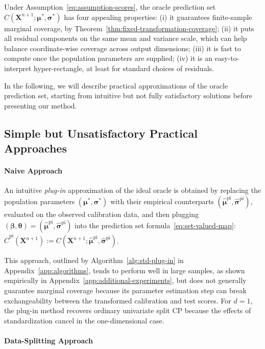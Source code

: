 Under Assumption~\ref{eq:assumption-scores}, the oracle prediction set $C(\mathbf X^{n+1};\boldsymbol\mu^*,\boldsymbol\sigma^*)$ has four appealing properties: (i) it guarantees finite-sample marginal coverage, by Theorem~\ref{thm:fixed-transformation-coverage}; (ii) it puts all residual components on the same mean and variance scale, which can help balance coordinate-wise coverage across output dimensions; (iii) it is fast to compute once the population parameters are supplied; (iv) it is an easy-to-interpret hyper-rectangle, at least for standard choices of residuals. 

In the following, we will describe practical approximations of the oracle prediction set, starting from intuitive but not fully satisfactory solutions before presenting our method.

\subsection{Simple but Unsatisfactory Practical Approaches}
\label{sec:data-splitting}

\paragraph{Naive Approach}

An intuitive {\em plug-in} approximation of the ideal oracle is obtained by replacing the population parameters $(\boldsymbol\mu^*,\boldsymbol\sigma^*)$ with their empirical counterparts $(\hat{\boldsymbol\mu}^{\mathrm{pi}},\hat{\boldsymbol\sigma}^{\mathrm{pi}})$, evaluated on the observed calibration data, and then plugging $(\boldsymbol\beta,\boldsymbol\theta)=(\hat{\boldsymbol\mu}^{\mathrm{pi}},\hat{\boldsymbol\sigma}^{\mathrm{pi}})$ into the prediction set formula~\eqref{eq:set-valued-map}:
$\hat C^{\mathrm{pi}}(\mathbf X^{n+1}):=C(\mathbf X^{n+1};\hat{\boldsymbol\mu}^{\mathrm{pi}},\hat{\boldsymbol\sigma}^{\mathrm{pi}})$.

This approach, outlined by Algorithm~\ref{alg:std-plug-in} in Appendix~\ref{app:algorithms}, tends to perform well in large samples, as shown empirically in Appendix~\ref{app:additional-experiments}, but does not generally guarantee marginal coverage because its parameter estimation step can break exchangeability between the transformed calibration and test scores. For $d=1$, the plug-in method recovers ordinary univariate split CP because the effects of standardization cancel in the one-dimensional case.

\paragraph{Data-Splitting Approach}

